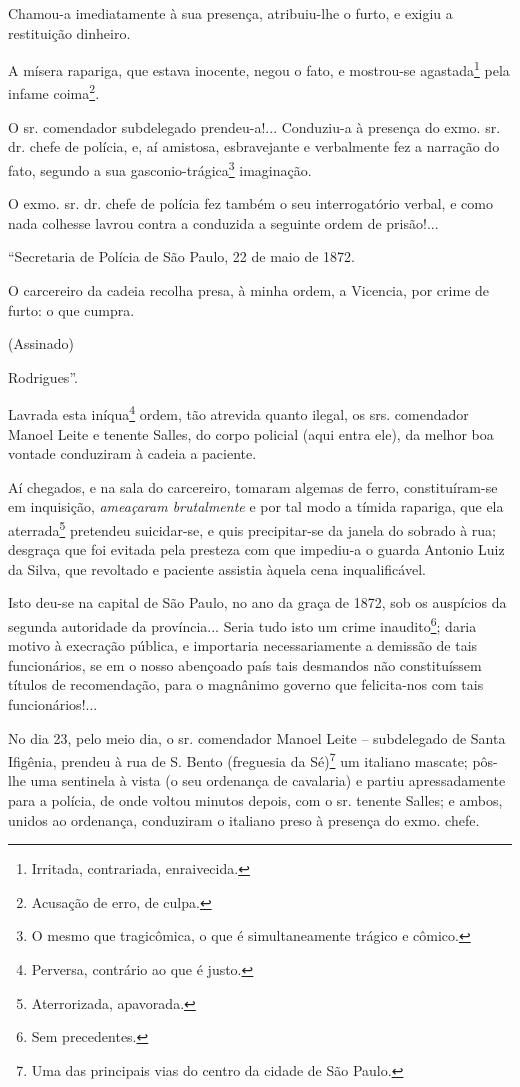 {Chamou-a imediatamente à sua presença, atribuiu-lhe o furto, e exigiu a
restituição dinheiro.

A mísera rapariga, que estava inocente, negou o fato, e mostrou-se
agastada\footnote{ Irritada, contrariada, enraivecida.} pela infame
coima\footnote{ Acusação de erro, de culpa.}.

O sr. comendador subdelegado prendeu-a!... Conduziu-a à presença do
exmo. sr. dr. chefe de polícia, e, aí amistosa, esbravejante e
verbalmente fez a narração do fato, segundo a sua
gasconio-trágica\footnote{ O mesmo que tragicômica, o que é
  simultaneamente trágico e cômico.} imaginação.

O exmo. sr. dr. chefe de polícia fez também o seu interrogatório verbal,
e como nada colhesse lavrou contra a conduzida a seguinte ordem de
prisão!...

``Secretaria de Polícia de São Paulo, 22 de maio de 1872.

O carcereiro da cadeia recolha presa, à minha ordem, a Vicencia, por
crime de furto: o que cumpra.

(Assinado)

Rodrigues''.

Lavrada esta iníqua\footnote{ Perversa, contrário ao que é justo.}
ordem, tão atrevida quanto ilegal, os srs. comendador Manoel Leite e
tenente Salles, do corpo policial (aqui entra ele), da melhor boa
vontade conduziram à cadeia a paciente.

Aí chegados, e na sala do carcereiro, tomaram algemas de ferro,
constituíram-se em inquisição, \emph{ameaçaram brutalmente} e por tal
modo a tímida rapariga, que ela aterrada\footnote{ Aterrorizada,
  apavorada.} pretendeu suicidar-se, e quis precipitar-se da janela do
sobrado à rua; desgraça que foi evitada pela presteza com que impediu-a
o guarda Antonio Luiz da Silva, que revoltado e paciente assistia àquela
cena inqualificável.

Isto deu-se na capital de São Paulo, no ano da graça de 1872, sob os
auspícios da segunda autoridade da província... Seria tudo isto um crime
inaudito\footnote{ Sem precedentes.}; daria motivo à execração pública,
e importaria necessariamente a demissão de tais funcionários, se em o
nosso abençoado país tais desmandos não constituíssem títulos de
recomendação, para o magnânimo governo que felicita-nos com tais
funcionários!...

No dia 23, pelo meio dia, o sr. comendador Manoel Leite -- subdelegado
de Santa Ifigênia, prendeu à rua de S. Bento (freguesia da
Sé)\footnote{ Uma das principais vias do centro da cidade de São Paulo.}
um italiano mascate; pôs-lhe uma sentinela à vista (o seu ordenança de
cavalaria) e partiu apressadamente para a polícia, de onde voltou
minutos depois, com o sr. tenente Salles; e ambos, unidos ao ordenança,
conduziram o italiano preso à presença do exmo. chefe.

}
